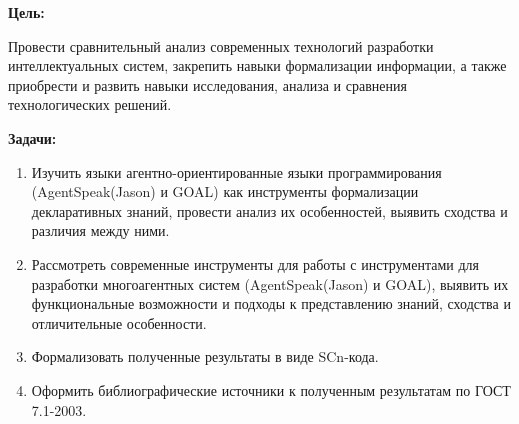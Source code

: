 
\textbf{Цель:}

Провести сравнительный анализ современных технологий разработки интеллектуальных систем, закрепить навыки формализации информации, а также приобрести и развить навыки исследования, анализа и сравнения технологических решений.

\bigskip

\textbf{Задачи:}

\begin{enumerate}
    \item Изучить языки агентно-ориентированные языки программирования (AgentSpeak(Jason) и GOAL) как инструменты формализации декларативных знаний, провести анализ их особенностей, выявить сходства и различия между ними.
    \item Рассмотреть современные инструменты для работы с инструментами для разработки многоагентных систем (AgentSpeak(Jason) и GOAL), выявить их функциональные возможности и подходы к представлению знаний, сходства и отличительные особенности.
    \item Формализовать полученные результаты в виде SCn-кода.
    \item Оформить библиографические источники к полученным результатам по ГОСТ 7.1-2003.
\end{enumerate}